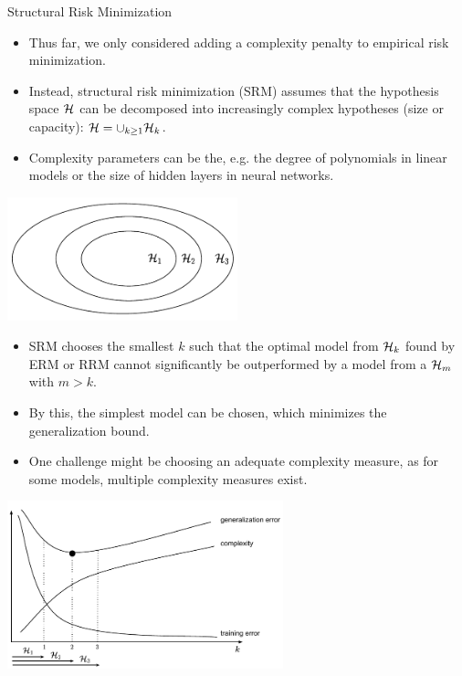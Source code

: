 \begin{vbframe} {Structural Risk Minimization}

\begin{itemize}
  \item Thus far, we only considered adding a complexity penalty to empirical risk minimization.
  \item Instead,  structural risk minimization (SRM) assumes that the hypothesis space $\mathcal{H}$ can be decomposed into increasingly complex hypotheses (size or capacity): $\mathcal{H} = \cup_{k \geq 1 }\mathcal{H}_{k}$.
  \item Complexity parameters can be the, e.g. the degree of polynomials in linear models or the size of hidden layers in neural networks.
\end{itemize}

\begin{center}
\includegraphics[width=0.5\textwidth]{figure_man/fig-regu-srm-1}
\end{center}

\framebreak


\begin{itemize}

    \item SRM chooses the smallest $k$ such that the optimal model from $\mathcal{H}_k$ found by ERM or RRM cannot significantly
        be outperformed by a model from a $\mathcal{H}_m$ with $m > k$.
  \item By this, the simplest model can be chosen, which minimizes the generalization bound.
  \item One challenge might be choosing an adequate complexity measure, as for some models, multiple complexity measures exist.
\end{itemize}

\begin{center}
\includegraphics[width=0.6\textwidth]{figure_man/fig-regu-srm-2}
\end{center}


\end{vbframe}
